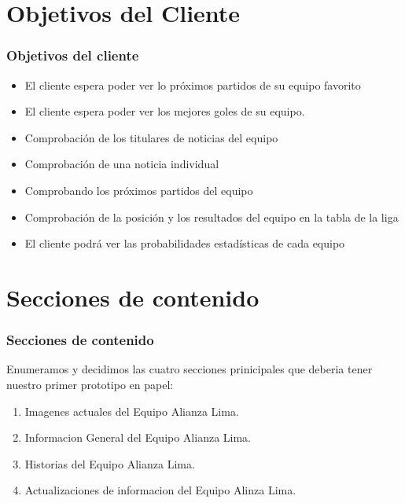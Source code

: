 \documentclass[11pt]{beamer}
\begin{document}
\section{Objetivos del Cliente}
\begin{frame}
\frametitle{Objetivos del cliente}
\begin{itemize}
\item El cliente espera poder ver lo próximos partidos de su equipo favorito
\item El cliente espera poder ver los mejores goles de su equipo.
\item Comprobación de los titulares de noticias del equipo
\item Comprobación de una noticia individual
\item Comprobando los próximos partidos del equipo
\item Comprobación de la posición y los resultados del equipo en la tabla de la liga
\item El cliente podrá ver las probabilidades estadísticas de cada equipo 

\end{itemize}
\end{frame}

\section{Secciones de contenido}
\begin{frame}
\frametitle{Secciones de contenido}

    \item Enumeramos y decidimos las cuatro secciones prinicipales que deberia tener nuestro primer prototipo en papel:
\begin{enumerate}
    \item Imagenes actuales del Equipo Alianza Lima.
    \item Informacion General del Equipo Alianza Lima.
    \item Historias del Equipo Alianza Lima.
    \item Actualizaciones de informacion del Equipo Alinza Lima.
\end{enumerate}
\end{frame}
\end{document}
